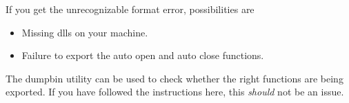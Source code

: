 \documentclass[12pt,reqno]{amsart}
\numberwithin{equation}{section}
\numberwithin{figure}{section}
\begin{document}
If you get the unrecognizable format error, possibilities are

\begin{itemize}
\item Missing dlls on your machine. 
\item Failure to export the auto open and auto close functions. 
\end{itemize}

The dumpbin utility can be used to check whether the right functions
are being exported. If you have followed the instructions here, this
{\em should} not be an issue.
\end{document}
